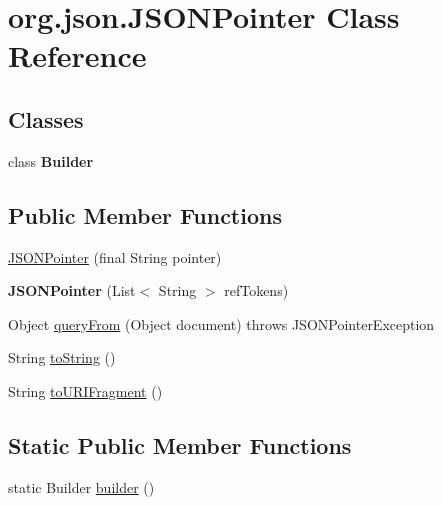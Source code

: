 \hypertarget{classorg_1_1json_1_1JSONPointer}{\section{org.\-json.\-J\-S\-O\-N\-Pointer Class Reference}
\label{classorg_1_1json_1_1JSONPointer}
}
\subsection*{Classes}
\begin{DoxyCompactItemize}
\item 
class {\bfseries Builder}
\end{DoxyCompactItemize}
\subsection*{Public Member Functions}
\begin{DoxyCompactItemize}
\item 
\hyperlink{classorg_1_1json_1_1JSONPointer_a00cf217b565e93e96db4b9e72a5ffd2c}{J\-S\-O\-N\-Pointer} (final String pointer)
\item 
\hypertarget{classorg_1_1json_1_1JSONPointer_ab6c21c4cfbd63415e3618a428448708b}{{\bfseries J\-S\-O\-N\-Pointer} (List$<$ String $>$ ref\-Tokens)}\label{classorg_1_1json_1_1JSONPointer_ab6c21c4cfbd63415e3618a428448708b}

\item 
Object \hyperlink{classorg_1_1json_1_1JSONPointer_a2de9719db18d0f9551a335877c2c7ef7}{query\-From} (Object document)  throws J\-S\-O\-N\-Pointer\-Exception 
\item 
String \hyperlink{classorg_1_1json_1_1JSONPointer_ae41154af3db8013a5f76a5354c08b5a6}{to\-String} ()
\item 
String \hyperlink{classorg_1_1json_1_1JSONPointer_a9c99fdeb3486aea49aed951269f51eda}{to\-U\-R\-I\-Fragment} ()
\end{DoxyCompactItemize}
\subsection*{Static Public Member Functions}
\begin{DoxyCompactItemize}
\item 
static Builder \hyperlink{classorg_1_1json_1_1JSONPointer_a68e413bf609396942ddc056a964acbd5}{builder} ()
\end{DoxyCompactItemize}


